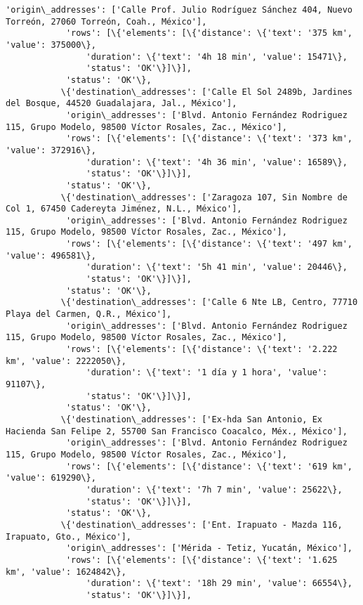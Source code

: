 \documentclass[11pt]{article}
\begin{document}
\begin{Verbatim}[commandchars=\\\{\}]
            'origin\_addresses': ['Calle Prof. Julio Rodríguez Sánchez 404, Nuevo Torreón, 27060 Torreón, Coah., México'],
            'rows': [\{'elements': [\{'distance': \{'text': '375 km', 'value': 375000\},
                'duration': \{'text': '4h 18 min', 'value': 15471\},
                'status': 'OK'\}]\}],
            'status': 'OK'\},
           \{'destination\_addresses': ['Calle El Sol 2489b, Jardines del Bosque, 44520 Guadalajara, Jal., México'],
            'origin\_addresses': ['Blvd. Antonio Fernández Rodriguez 115, Grupo Modelo, 98500 Víctor Rosales, Zac., México'],
            'rows': [\{'elements': [\{'distance': \{'text': '373 km', 'value': 372916\},
                'duration': \{'text': '4h 36 min', 'value': 16589\},
                'status': 'OK'\}]\}],
            'status': 'OK'\},
           \{'destination\_addresses': ['Zaragoza 107, Sin Nombre de Col 1, 67450 Cadereyta Jiménez, N.L., México'],
            'origin\_addresses': ['Blvd. Antonio Fernández Rodriguez 115, Grupo Modelo, 98500 Víctor Rosales, Zac., México'],
            'rows': [\{'elements': [\{'distance': \{'text': '497 km', 'value': 496581\},
                'duration': \{'text': '5h 41 min', 'value': 20446\},
                'status': 'OK'\}]\}],
            'status': 'OK'\},
           \{'destination\_addresses': ['Calle 6 Nte LB, Centro, 77710 Playa del Carmen, Q.R., México'],
            'origin\_addresses': ['Blvd. Antonio Fernández Rodriguez 115, Grupo Modelo, 98500 Víctor Rosales, Zac., México'],
            'rows': [\{'elements': [\{'distance': \{'text': '2.222 km', 'value': 2222050\},
                'duration': \{'text': '1 día y 1 hora', 'value': 91107\},
                'status': 'OK'\}]\}],
            'status': 'OK'\},
           \{'destination\_addresses': ['Ex-hda San Antonio, Ex Hacienda San Felipe 2, 55700 San Francisco Coacalco, Méx., México'],
            'origin\_addresses': ['Blvd. Antonio Fernández Rodriguez 115, Grupo Modelo, 98500 Víctor Rosales, Zac., México'],
            'rows': [\{'elements': [\{'distance': \{'text': '619 km', 'value': 619290\},
                'duration': \{'text': '7h 7 min', 'value': 25622\},
                'status': 'OK'\}]\}],
            'status': 'OK'\},
           \{'destination\_addresses': ['Ent. Irapuato - Mazda 116, Irapuato, Gto., México'],
            'origin\_addresses': ['Mérida - Tetiz, Yucatán, México'],
            'rows': [\{'elements': [\{'distance': \{'text': '1.625 km', 'value': 1624842\},
                'duration': \{'text': '18h 29 min', 'value': 66554\},
                'status': 'OK'\}]\}],

\end{Verbatim}
\end{document}
